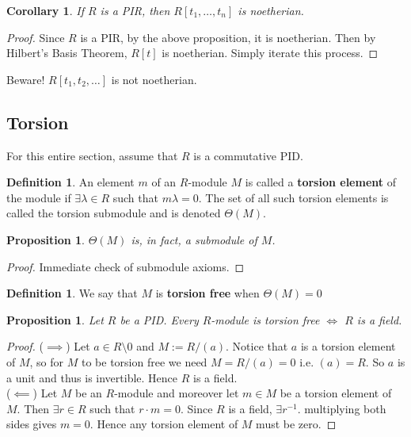 \documentclass[12pt]{book}
\newtheorem{proposition}[theorem]{Proposition}
\newtheorem{corollary}[theorem]{Corollary}
\theoremstyle{definition}
\newtheorem{definition}[theorem]{Definition}
\begin{document}
\begin{corollary}
    If $R$ is a PIR, then $R[t_1, \dots, t_n]$ is noetherian. 
\end{corollary}
\begin{proof}
    Since $R$ is a PIR, by the above proposition, it is noetherian. Then by Hilbert's Basis Theorem, $R[t]$ is noetherian. Simply iterate this process. 
\end{proof}

Beware! $R[t_1, t_2, \dots]$ is not noetherian. 

\subsection{Torsion}
For this entire section, assume that $R$ is a commutative PID. 
\begin{definition}
    An element $m$ of an $R$-module $M$ is called a \textbf{torsion element} of the module if $\exists \lambda \in R$ such that $m\lambda = 0$. The set of all such torsion elements is called the torsion submodule and is denoted $\Theta(M)$. 
\end{definition}

\begin{proposition}
    $\Theta(M)$ is, in fact, a submodule of $M$. 
\end{proposition}
\begin{proof}
    Immediate check of submodule axioms. 
\end{proof}

\begin{definition}
    We say that $M$ is \textbf{torsion free} when $\Theta(M) = 0$ 
\end{definition}
\begin{proposition}\label{TorsionFreeField}
    Let $R$ be a PID. Every $R$-module is torsion free $\iff$ $R$ is a field. 
\end{proposition}
\begin{proof}
    ($\implies$)
    Let $a \in R\setminus {0}$ and $M := R/(a)$. Notice that $a$ is a torsion element of $M$, so for $M$ to be torsion free we need $M = R/(a) = 0$ i.e. $(a) = R$. So $a$ is a unit and thus is invertible. Hence $R$ is a field.\\
    ($\impliedby$) Let $M$ be an $R$-module and moreover let $m \in M$ be a torsion element of $M$. Then $\exists r \in R$ such that $r \cdot m = 0$. Since $R$ is a field, $\exists r^{-1}$. multiplying both sides gives $m = 0$. Hence any torsion element of $M$ must be zero. 
\end{proof}
\end{document}
